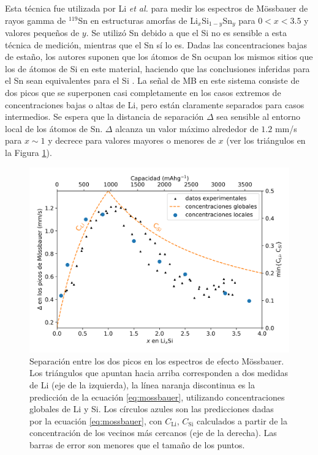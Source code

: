 Esta técnica fue utilizada por Li \textit{et al.} \cite{li2009} para medir los espectros de 
Mössbauer de rayos gamma de $^{119}$Sn en estructuras amorfas de 
Li$_x$Si$_{1-y}$Sn$_y$ para $0 < x < 3.5$ y valores pequeños de $y$. Se utilizó Sn debido a que el Si no es sensible a esta técnica de medición, mientras que el Sn sí lo es.
Dadas las concentraciones bajas de estaño, los autores suponen que los átomos de Sn
ocupan los mismos sitios que los de átomos de Si en este material, haciendo que 
las conclusiones inferidas para el Sn sean equivalentes para el Si 
\cite{hatchard2005}. La señal de MB en este sistema consiste de dos picos que se superponen casi 
completamente en los casos extremos de concentraciones bajas o altas de Li, 
pero están claramente separados para casos intermedios. Se espera que la distancia de separación
$\Delta$ sea sensible al entorno local de los átomos de Sn. $\Delta$
alcanza un valor máximo alrededor de $1.2$ mm/s para $x \sim 1$ y decrece para 
valores mayores o menores de $x$ (ver los triángulos en la Figura \ref{fig:mossbauer}).
\begin{figure}[h!]
    \centering
    \includegraphics[width=.7\textwidth]{Silicio/prediccion/resultados/mossbauer/mossbauer.png}
    \caption{Separación entre los dos picos en los espectros de efecto 
    Mössbauer. Los triángulos que apuntan hacia arriba corresponden a dos 
    medidas de Li  \cite{li2009} (eje de la izquierda), la línea naranja discontinua es la 
    predicción de la ecuación \ref{eq:mossbauer}, utilizando concentraciones 
    globales de Li y Si. Los círculos azules son las predicciones dadas 
    por la ecuación \ref{eq:mossbauer}, con $C_{\text{Li}}$, $C_{\text{Si}}$ 
    calculados a partir de la concentración de los vecinos más cercanos (eje de 
    la derecha). Las barras de error son menores que el tamaño de los puntos.}
    \label{fig:mossbauer}
\end{figure}
